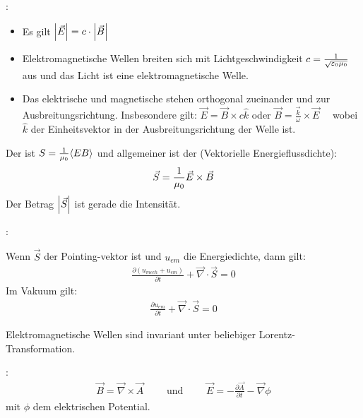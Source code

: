 \pagebreak

:
\begin{itemize}
    \item Es gilt $\left\vert \vec{E} \right\vert = c \cdot \left\vert \vec{B} \right\vert$
    \item Elektromagnetische Wellen breiten sich mit Lichtgeschwindigkeit $c =
            \frac{1}{\sqrt{\varepsilon_0 \mu_0}}$ aus und das Licht ist eine elektromagnetische
            Welle.
    \item Das elektrische und magnetische stehen orthogonal zueinander und zur Ausbreitungsrichtung.
            Insbesondere gilt: $\vec{E} = \vec{B} \times c \hat{k}$ oder $\vec{B} =
            \frac{\vec{k}}{\omega} \times \vec{E}$ \ \ wobei $\hat{k}$ der Einheitsvektor in
            der Ausbreitungsrichtung der Welle ist.
\end{itemize}

\vspace{1\baselineskip}

Der  ist $S = \frac{1}{\mu_0} \langle E B \rangle$ und allgemeiner ist
der  (Vektorielle Energieflussdichte):
\begin{align*}
    \vec{S} = \frac{1}{\mu_0} \vec{E} \times \vec{B}
\end{align*}
Der Betrag $\left\vert \vec{S} \right\vert$ ist gerade die Intensität.

\vspace{1\baselineskip}

:

Wenn $\vec{S}$ der Pointing-vektor ist und $u_{em}$ die Energiedichte, dann gilt:
\begin{align*}
    \frac{\partial(u_{mech} + u_{em})}{\partial t} + \vec{\nabla} \cdot \vec{S} = 0
\end{align*}
Im Vakuum gilt:
\begin{align*}
    \frac{\partial u_{em}}{\partial t} + \vec{\nabla} \cdot \vec{S} = 0
\end{align*}

\vspace{1\baselineskip}

Elektromagnetische Wellen sind invariant unter beliebiger Lorentz-Transformation.

\vspace{1\baselineskip}

:
\begin{align*}
    \vec{B} = \vec{\nabla} \times \vec{A}
    \quad \quad \text{  und  } \quad \quad
    \vec{E} = - \frac{\partial \vec{A}}{\partial t} - \vec{\nabla} \phi
\end{align*}
mit $\phi$ dem elektrischen Potential.

